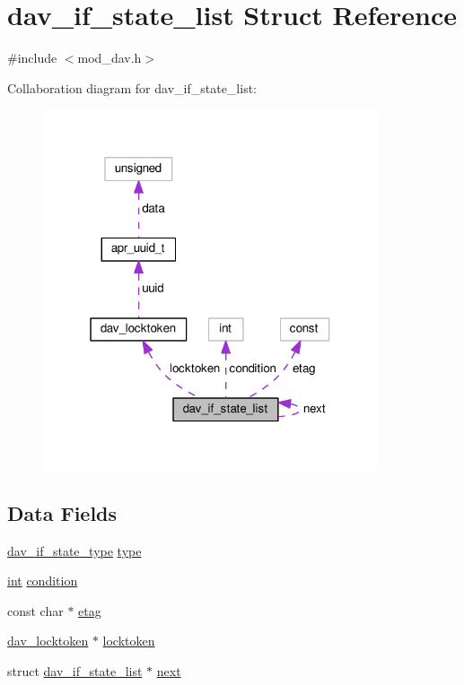 \hypertarget{structdav__if__state__list}{}\section{dav\+\_\+if\+\_\+state\+\_\+list Struct Reference}
\label{structdav__if__state__list}


{\ttfamily \#include $<$mod\+\_\+dav.\+h$>$}



Collaboration diagram for dav\+\_\+if\+\_\+state\+\_\+list\+:
\nopagebreak
\begin{figure}[H]
\begin{center}
\leavevmode
\includegraphics[width=280pt]{structdav__if__state__list__coll__graph}
\end{center}
\end{figure}
\subsection*{Data Fields}
\begin{DoxyCompactItemize}
\item 
\hyperlink{group__MOD__DAV_gaacd61686abea10e22a15da15b91906b7}{dav\+\_\+if\+\_\+state\+\_\+type} \hyperlink{structdav__if__state__list_adbad3b21c38d6af7f44a7473ba354189}{type}
\item 
\hyperlink{pcre_8txt_a42dfa4ff673c82d8efe7144098fbc198}{int} \hyperlink{structdav__if__state__list_af2fa737287b79652b0867c0ed1a7129a}{condition}
\item 
const char $\ast$ \hyperlink{structdav__if__state__list_ad306a2a8051d036b75a3a10eb49f74f5}{etag}
\item 
\hyperlink{structdav__locktoken}{dav\+\_\+locktoken} $\ast$ \hyperlink{structdav__if__state__list_a45ea6ca63ec1efec217f600d6f6df55c}{locktoken}
\item 
struct \hyperlink{structdav__if__state__list}{dav\+\_\+if\+\_\+state\+\_\+list} $\ast$ \hyperlink{structdav__if__state__list_af93fa645bf12dcdd6b7b3e3f605647f6}{next}
\end{DoxyCompactItemize}


